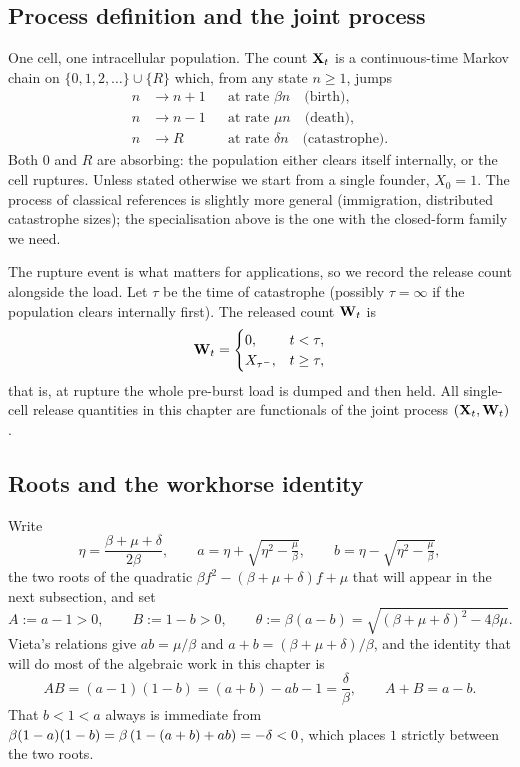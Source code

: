 \subsection{Process definition and the joint process}

One cell, one intracellular population. The count ${{\bf X}_t}$ is a continuous-time
Markov chain on $\{0,1,2,\ldots\}\cup\{R\}$ which, from any state $n\ge1$,
jumps
\begin{align*}
n &\to n+1 &&\text{at rate } \beta n \quad\text{(birth)},\\
n &\to n-1 &&\text{at rate } \mu n \quad\text{(death)},\\
n &\to R &&\text{at rate } \delta n \quad\text{(catastrophe)}.
\end{align*}
Both $0$ and $R$ are absorbing: the population either clears itself
internally, or the cell ruptures. Unless stated otherwise we start from a
single founder, $X_0=1$. The process of classical references
\cite{brockwell1982birth,karlin1982linear,di2008note} is slightly more
general (immigration, distributed catastrophe sizes); the specialisation
above is the one with the closed-form family we need.

The rupture event is what matters for applications, so we record the release
count alongside the load. Let $\tau$ be the time of catastrophe (possibly
$\tau=\infty$ if the population clears internally first). The released count
${{\bf W}_t}$ is
\[
{{\bf W}_t} = \begin{cases}
0, & t<\tau,\\
X_{\tau^-}, & t\ge\tau,
\end{cases}
\]
that is, at rupture the whole pre-burst load is dumped and then held. All
single-cell release quantities in this chapter are functionals of the joint
process $({{\bf X}_t},{{\bf W}_t})$.

\subsection{Roots and the workhorse identity}

Write
\begin{equation}
\eta=\frac{\beta+\mu+\delta}{2\beta},\qquad
a=\eta+\sqrt{\eta^2-\tfrac{\mu}{\beta}},\qquad
b=\eta-\sqrt{\eta^2-\tfrac{\mu}{\beta}},
\end{equation}
the two roots of the quadratic $\beta f^2-(\beta+\mu+\delta)f+\mu$ that will
appear in the next subsection, and set
\begin{equation}
A:=a-1>0,\qquad B:=1-b>0,\qquad \theta:=\beta(a-b)
=\sqrt{(\beta+\mu+\delta)^2-4\beta\mu}.
\end{equation}
Vieta's relations give $ab=\mu/\beta$ and $a+b=(\beta+\mu+\delta)/\beta$, and
the identity that will do most of the algebraic work in this chapter is
\begin{equation}
AB=(a-1)(1-b)=(a+b)-ab-1=\frac{\delta}{\beta},
\qquad A+B=a-b.
\label{eq:AB}
\end{equation}
That $b<1<a$ always is immediate from
$\beta(1-a)(1-b)=\beta\left(1-(a+b)+ab\right)=-\delta<0$, which places $1$ strictly
between the two roots.


